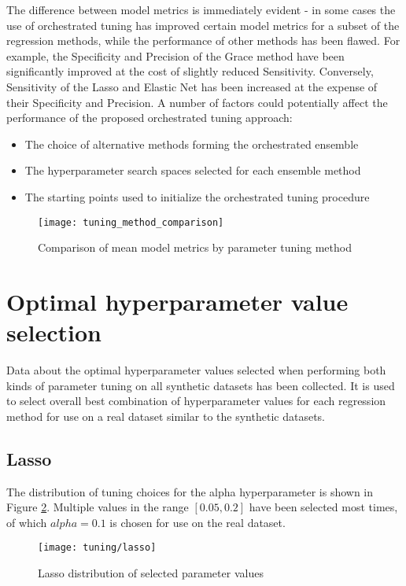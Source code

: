 

The difference between model metrics is immediately evident - in some cases the use of orchestrated tuning has improved certain model metrics for a subset of the regression methods, while the performance of other methods has been flawed. For example, the Specificity and Precision of the Grace method have been significantly improved at the cost of slightly reduced Sensitivity. Conversely, Sensitivity of the Lasso and Elastic Net has been increased at the expense of their Specificity and Precision. A number of factors could potentially affect the performance of the proposed orchestrated tuning approach:
\begin{itemize}
	\item The choice of alternative methods forming the orchestrated ensemble
	\item The hyperparameter search spaces selected for each ensemble method
	\item The starting points used to initialize the orchestrated tuning procedure
\end{itemize}

\begin{figure}[H]
	\centering
	\texttt{[image: tuning\_method\_comparison]}
	\caption{Comparison of mean model metrics by parameter tuning method}
	\label{fig:met_comp}
\end{figure}

\section{Optimal hyperparameter value selection}
Data about the optimal hyperparameter values selected when performing both kinds of parameter tuning on all synthetic datasets has been collected. It is used to select overall best combination of hyperparameter values for each regression method for use on a real dataset similar to the synthetic datasets.

\subsection{Lasso}
The distribution of tuning choices for the alpha hyperparameter is shown in Figure \ref{fig:tun_lasso}. Multiple values in the range $[0.05, 0.2]$ have been selected most times, of which $alpha = 0.1$ is chosen for use on the real dataset.
\begin{figure}[H]
	\centering
	\texttt{[image: tuning/lasso]}
	\caption{Lasso distribution of selected parameter values}
	\label{fig:tun_lasso}
\end{figure}

